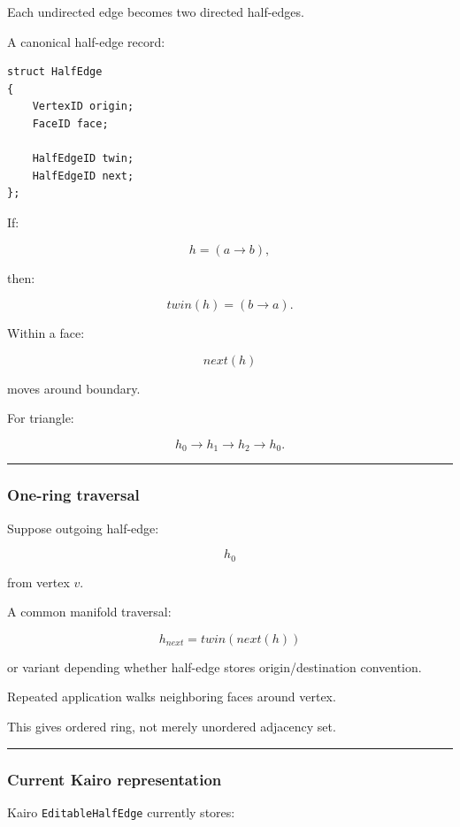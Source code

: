 Each undirected edge becomes two directed half-edges.

A canonical half-edge record:

\begin{verbatim}
struct HalfEdge
{
    VertexID origin;
    FaceID face;

    HalfEdgeID twin;
    HalfEdgeID next;
};
\end{verbatim}

If:

\[
h=(a\rightarrow b),
\]

then:

\[
twin(h)
=
(b\rightarrow a).
\]

Within a face:

\[
next(h)
\]

moves around boundary.

For triangle:

\[
h_0\rightarrow h_1\rightarrow h_2\rightarrow h_0.
\]

\begin{center}\rule{0.5\linewidth}{0.5pt}\end{center}

\subsubsection{One-ring traversal}\label{one-ring-traversal}

Suppose outgoing half-edge:

\[
h_0
\]

from vertex \(v\).

A common manifold traversal:

\[
\boxed{
h_{next}
=
twin(next(h))
}
\]

or variant depending whether half-edge stores origin/destination convention.

Repeated application walks neighboring faces around vertex.

This gives ordered ring, not merely unordered adjacency set.

\begin{center}\rule{0.5\linewidth}{0.5pt}\end{center}

\subsubsection{Current Kairo representation}\label{current-kairo-representation}

Kairo \texttt{EditableHalfEdge} currently stores:

